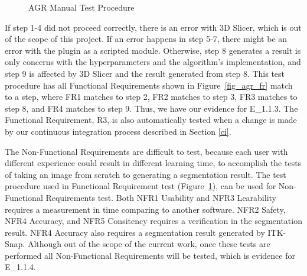 \begin{figure}[H]
\caption[AGR Manual Test Procedure]{AGR Manual Test Procedure}
\label{test_procedure}
\end{figure}

If step 1-4 did not proceed correctly, there is an error with 3D Slicer, which is out of the scope of this project. If an error happens in step 5-7, there might be an error with the plugin as a scripted module. Otherwise, step 8 generates a result is only concerns with the hyperparameters and the algorithm's implementation, and step 9 is affected by 3D Slicer and the result generated from step 8. This test procedure has all Functional Requirements shown in Figure~\ref{fig_agr_fr} match to a step, where FR1 matches to step 2, FR2 matches to step 3, FR3 matches to step 8, and FR4 matches to step 9. Thus, we have our evidence for E\_1.1.3. The Functional Requirement, R3, is also automatically tested when a change is made by our continuous integration process described in Section \ref{ci}.

The Non-Functional Requirements are difficult to test, because each user with different experience could result in different learning time, to accomplish the tests of taking an image from scratch to generating a segmentation result. The test procedure used in Functional Requirement test (Figure~\ref{test_procedure}), can be used for Non-Functional Requirements test. Both NFR1 Usability and NFR3 Learability requires a measurement in time comparing to another software. NFR2 Safety, NFR4 Accuracy, and NFR5 Consitency requires a verification in the segmentation result. NFR4 Accuracy also requires a segmentation result generated by ITK-Snap. Although out of the scope of the current work, once these tests are performed all Non-Functional Requirements will be tested, which is evidence for E\_1.1.4.

